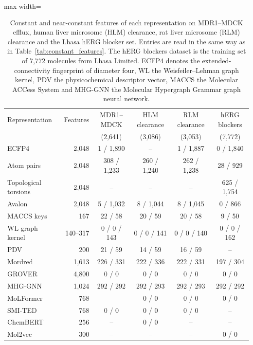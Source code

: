 \begin{table}[htbp]
\centering
\small
\setlength{\tabcolsep}{4pt}
\begin{adjustbox}{max width=\textwidth}
\begin{tabular}{lrcccc}
\toprule
Representation & Features & MDR1--MDCK & HLM clearance & RLM clearance & hERG blockers \\
 & & (2,641) & (3,086) & (3,053) & (7,772) \\
\midrule
ECFP4 & 2,048 & 1 / 1,890 & -- & 1 / 1,887 & 0 / 1,840 \\
Atom pairs & 2,048 & 308 / 1,233 & 260 / 1,240 & 262 / 1,238 & 28 / 929 \\
Topological torsions & 2,048 & -- & -- & -- & 625 / 1,754 \\
Avalon & 2,048 & 5 / 1,032 & 8 / 1,044 & 8 / 1,045 & 0 / 866 \\
MACCS keys & 167 & 22 / 58 & 20 / 59 & 20 / 58 & 9 / 50 \\
WL graph kernel & 140--317 & 0 / 0 / 143 & 0 / 0 / 141 & 0 / 0 / 140 & 0 / 0 / 162 \\
PDV & 200 & 21 / 59 & 14 / 59 & 16 / 59 & -- \\
Mordred & 1,613 & 226 / 331 & 222 / 336 & 222 / 331 & 197 / 304 \\
GROVER & 4,800 & 0 / 0 & 0 / 0 & 0 / 0 & 0 / 0 \\
MHG-GNN & 1,024 & 292 / 292 & 292 / 293 & 292 / 293 & 292 / 292 \\
MoLFormer & 768 & -- & 0 / 0 & 0 / 0 & 0 / 0 \\
SMI-TED & 768 & 0 / 0 & 0 / 0 & 0 / 0 & -- \\
ChemBERT & 256 & -- & 0 / 0 & -- & -- \\
Mol2vec & 300 & -- & -- & -- & 0 / 0 \\
\bottomrule
\end{tabular}
\end{adjustbox}
\caption[Constant and near-constant features per representation, part 2.]{Constant and near-constant features of each representation on MDR1--MDCK efflux, human liver microsome (HLM) clearance, rat liver microsome (RLM) clearance and the Lhasa hERG blocker set. Entries are read in the same way as in Table~\ref{tab:constant_features}. The hERG blockers dataset is the training set of 7,772 molecules from Lhasa Limited. ECFP4 denotes the extended-connectivity fingerprint of diameter four, WL the Weisfeiler--Lehman graph kernel, PDV the physicochemical descriptor vector, MACCS the Molecular ACCess System and MHG-GNN the Molecular Hypergraph Grammar graph neural network.}
\label{tab:constant_features_b}
\end{table}


